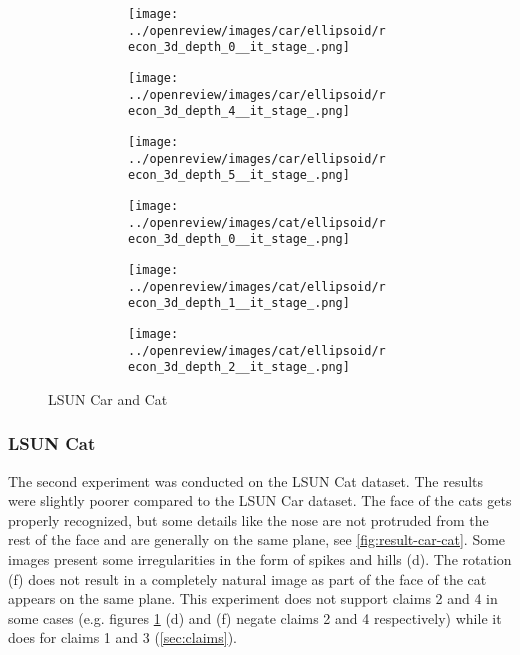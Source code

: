 \begin{figure}[h]
\begin{subfigure}{0.80\textwidth}
        \begin{subfigure}{0.16\textwidth}
            \centering
            \texttt{[image: ../openreview/images/car/ellipsoid/recon\_3d\_depth\_0\_\_it\_stage\_.png]}
            \caption{}
        \end{subfigure}
        \begin{subfigure}{0.16\textwidth}
            \centering
            \texttt{[image: ../openreview/images/car/ellipsoid/recon\_3d\_depth\_4\_\_it\_stage\_.png]}
            \caption{}
        \end{subfigure}
        \begin{subfigure}{0.16\textwidth}
            \centering
            \texttt{[image: ../openreview/images/car/ellipsoid/recon\_3d\_depth\_5\_\_it\_stage\_.png]}
            \caption{}
        \end{subfigure}
        \begin{subfigure}{0.16\textwidth}
            \centering
            \texttt{[image: ../openreview/images/cat/ellipsoid/recon\_3d\_depth\_0\_\_it\_stage\_.png]}
            \caption{}
        \end{subfigure}
        \begin{subfigure}{0.16\textwidth}
            \centering
            \texttt{[image: ../openreview/images/cat/ellipsoid/recon\_3d\_depth\_1\_\_it\_stage\_.png]}
            \caption{}
        \end{subfigure}
        \begin{subfigure}{0.16\textwidth}
            \centering
            \texttt{[image: ../openreview/images/cat/ellipsoid/recon\_3d\_depth\_2\_\_it\_stage\_.png]}
            \caption{}
        \end{subfigure}
    
    \end{subfigure}
    \caption{LSUN Car and Cat}
    \label{fig:result-car-cat}
\end{figure}
\subsubsection{LSUN Cat}
The second experiment was conducted on the LSUN Cat dataset. The results were slightly poorer compared to the LSUN Car dataset. The face of the cats gets properly recognized, but some details like the nose are not protruded from the rest of the face and are generally on the same plane, see \autoref{fig:result-car-cat}. Some images present some irregularities in the form of spikes and hills (d). The rotation (f) does not result in a completely natural image as part of the face of the cat appears on the same plane. This experiment does not support claims 2 and 4 in some cases (e.g. figures \ref{fig:result-car-cat} (d) and (f) negate claims 2 and 4 respectively) while it does for claims 1 and 3 (\autoref{sec:claims}).
